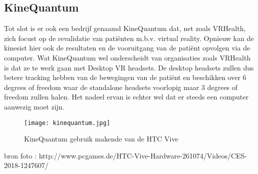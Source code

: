 \subsection{KineQuantum}
Tot slot is er ook een bedrijf genaamd KineQuantum dat, net zoals VRHealth, zich focust op de revalidatie van patiënten m.b.v. virtual reality. Opnieuw kan de kinesist hier ook de resultaten en de vooruitgang van de patiënt opvolgen via de computer. Wat KineQuantum wel onderscheidt van organisaties zoals VRHealth is dat ze te werk gaan met Desktop VR headsets. De desktop headsets zullen dus betere tracking hebben van de bewegingen van de patiënt en beschikken over 6 degrees of freedom waar de standalone headsets voorlopig maar 3 degrees of freedom zullen halen. Het nadeel ervan is echter wel dat er steeds een computer aanwezig moet zijn. 

\begin{figure}[h]
    \centering
    \texttt{[image: kinequantum.jpg]}
    \caption{KineQuantum gebruik makende van de HTC Vive}
\end{figure}
bron foto : http://www.pcgames.de/HTC-Vive-Hardware-261074/Videos/CES-2018-1247607/
